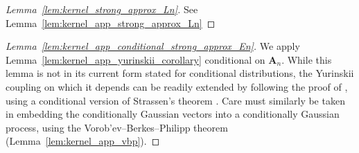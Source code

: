\documentclass[11pt,lof]{puthesis}
\newcommand{\bA}{\ensuremath{\mathbf{A}}}
\theoremstyle{break}
\theoremstyle{proof}
\newtheorem{proof}{Proof}
\begin{document}
\begin{proof}[Lemma~\ref{lem:kernel_strong_approx_Ln}]
See Lemma~\ref{lem:kernel_app_strong_approx_Ln}
\end{proof}

\begin{proof}[Lemma~\ref{lem:kernel_app_conditional_strong_approx_En}]

We apply Lemma~\ref{lem:kernel_app_yurinskii_corollary} conditional on
$\bA_n$. While this lemma is not in its current form
stated for conditional distributions,
the Yurinskii coupling on which it depends can be readily extended
by following the proof of \citet[Lemma~38]{belloni2019conditional},
using a conditional version of Strassen's theorem
\cite[Theorem~B.2]{chen2020jackknife}.
Care must similarly be taken in embedding the conditionally Gaussian vectors
into a conditionally Gaussian process, using the
Vorob'ev--Berkes--Philipp theorem (Lemma~\ref{lem:kernel_app_vbp}).


\end{proof}
\end{document}
